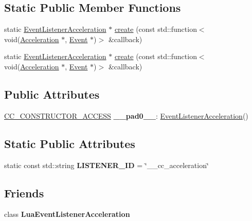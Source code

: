 \subsection*{Static Public Member Functions}
\begin{DoxyCompactItemize}
\item 
static \hyperlink{classEventListenerAcceleration}{Event\+Listener\+Acceleration} $\ast$ \hyperlink{classEventListenerAcceleration_a6d795a6b7fd3ebe2d9f8e463877227f5}{create} (const std\+::function$<$ void(\hyperlink{classAcceleration}{Acceleration} $\ast$, \hyperlink{classEvent}{Event} $\ast$)$>$ \&callback)
\item 
static \hyperlink{classEventListenerAcceleration}{Event\+Listener\+Acceleration} $\ast$ \hyperlink{classEventListenerAcceleration_ad1f824d5c1bc1f19d7464c00e41ac587}{create} (const std\+::function$<$ void(\hyperlink{classAcceleration}{Acceleration} $\ast$, \hyperlink{classEvent}{Event} $\ast$)$>$ \&callback)
\end{DoxyCompactItemize}
\subsection*{Public Attributes}
\begin{DoxyCompactItemize}
\item 
\mbox{\label{classEventListenerAcceleration_a4c5eb6737c0791bb1449437b893ad905}} 
\hyperlink{_2cocos2d_2cocos_2base_2ccConfig_8h_a25ef1314f97c35a2ed3d029b0ead6da0}{C\+C\+\_\+\+C\+O\+N\+S\+T\+R\+U\+C\+T\+O\+R\+\_\+\+A\+C\+C\+E\+SS} {\bfseries \+\_\+\+\_\+pad0\+\_\+\+\_\+}\+: \hyperlink{classEventListenerAcceleration}{Event\+Listener\+Acceleration}()
\end{DoxyCompactItemize}
\subsection*{Static Public Attributes}
\begin{DoxyCompactItemize}
\item 
\mbox{\label{classEventListenerAcceleration_a7f651c8d574574950fbb00f0299fc542}} 
static const std\+::string {\bfseries L\+I\+S\+T\+E\+N\+E\+R\+\_\+\+ID} = \char`\"{}\+\_\+\+\_\+cc\+\_\+acceleration\char`\"{}
\end{DoxyCompactItemize}
\subsection*{Friends}
\begin{DoxyCompactItemize}
\item 
\mbox{\label{classEventListenerAcceleration_a6b8cb23fe31bde0d3e52d1cdc4caadcd}} 
class {\bfseries Lua\+Event\+Listener\+Acceleration}
\end{DoxyCompactItemize}
